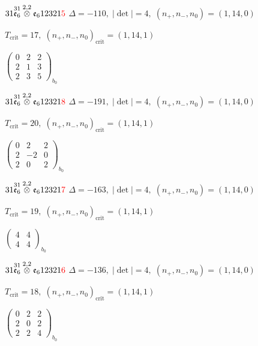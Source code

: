\documentclass[10pt]{article}
\begin{document}
$31\overset{31}{\mathfrak{e}_6}\overset{2,2}{\otimes}\mathfrak{e}_612321\textcolor{red}{5}$ \quad $\Delta=-110,\; |\det|=4,\; (n_+,n_-,n_0)=(1,14,0)$

\hspace{1em}$T_{\text{crit}}=17,\; (n_+,n_-,n_0)_{\text{crit}}=(1,14,1)$

\hspace{2em}$\left(\begin{smallmatrix}0 & 2 & 2 \\ 2 & 1 & 3 \\ 2 & 3 & 5\end{smallmatrix}\right)_{\!b_0}$

$31\overset{31}{\mathfrak{e}_6}\overset{2,2}{\otimes}\mathfrak{e}_612321\textcolor{red}{8}$ \quad $\Delta=-191,\; |\det|=4,\; (n_+,n_-,n_0)=(1,14,0)$

\hspace{1em}$T_{\text{crit}}=20,\; (n_+,n_-,n_0)_{\text{crit}}=(1,14,1)$

\hspace{2em}$\left(\begin{smallmatrix}0 & 2 & 2 \\ 2 & -2 & 0 \\ 2 & 0 & 2\end{smallmatrix}\right)_{\!b_0}$

$31\overset{31}{\mathfrak{e}_6}\overset{2,2}{\otimes}\mathfrak{e}_612321\textcolor{red}{7}$ \quad $\Delta=-163,\; |\det|=4,\; (n_+,n_-,n_0)=(1,14,0)$

\hspace{1em}$T_{\text{crit}}=19,\; (n_+,n_-,n_0)_{\text{crit}}=(1,14,1)$

\hspace{2em}$\left(\begin{smallmatrix}4 & 4 \\ 4 & 4\end{smallmatrix}\right)_{\!b_0}$

$31\overset{31}{\mathfrak{e}_6}\overset{2,2}{\otimes}\mathfrak{e}_612321\textcolor{red}{6}$ \quad $\Delta=-136,\; |\det|=4,\; (n_+,n_-,n_0)=(1,14,0)$

\hspace{1em}$T_{\text{crit}}=18,\; (n_+,n_-,n_0)_{\text{crit}}=(1,14,1)$

\hspace{2em}$\left(\begin{smallmatrix}0 & 2 & 2 \\ 2 & 0 & 2 \\ 2 & 2 & 4\end{smallmatrix}\right)_{\!b_0}$
\end{document}
